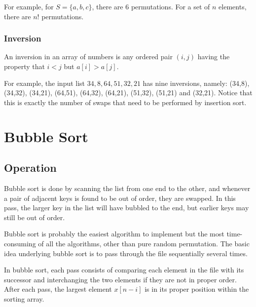 For example, for \(S = \{a, b, c\}\), there are 6 permutations. For a set of \(n\) elements, there are \(n!\) permutations. 


\subsubsection{Inversion}
An inversion in an array of numbers is any ordered pair \((i, j)\) having the property that \(i < j\) but \(a[i] > a[j]\). 

For example, the input list \(34, 8, 64, 51, 32, 21\) has nine inversions, namely: (34,8), (34,32), (34,21), (64,51), (64,32),
(64,21), (51,32), (51,21) and (32,21). Notice that this is exactly the number of swaps that need to be performed by insertion sort.

\section{Bubble Sort}
\subsection{Operation}
Bubble sort is done by scanning the list from one end to the other, and whenever a pair of adjacent keys is found to be out of order, they are swapped. In this pass, the larger key in the list will have bubbled to the end, but earlier keys may still be out of order.

Bubble sort is probably the easiest algorithm to implement but the most time-consuming of all the algorithms, other than pure random permutation. The basic idea underlying bubble sort is to pass through the file sequentially several times.

In bubble sort, each pass consists of comparing each element in the file with its successor and interchanging the two elements if they are not in proper order. After each pass, the largest element \(x[n - i]\) is in its proper position within the sorting array.

